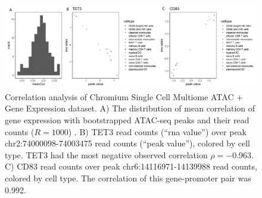 \documentclass{article}
\begin{document}
\begin{figure}[htbp]
\centering
\includegraphics[scale=0.08]{Figures/sfig2.jpeg}
\caption{Correlation analysis of Chromium Single Cell
  Multiome ATAC + Gene Expression dataset. A) The distribution of mean
  correlation of gene expression with bootstrapped
  ATAC-seq peaks and their read counts ($R = 1000$) .
  B) TET3 read counts (``rna value'') over peak
  chr2:74000098-74003475 read counts (``peak value''),
  colored by cell type. TET3 had
  the most negative observed correlation $\rho = −0.963$.
  C) CD83 read
  counts over peak chr6:14116971-14139988 read counts, colored by cell
  type. The correlation of this gene-promoter pair was
  0.992. }
\label{fig:suppfig3}
\end{figure}


%
%
%
%
%
%
%

\end{document}
